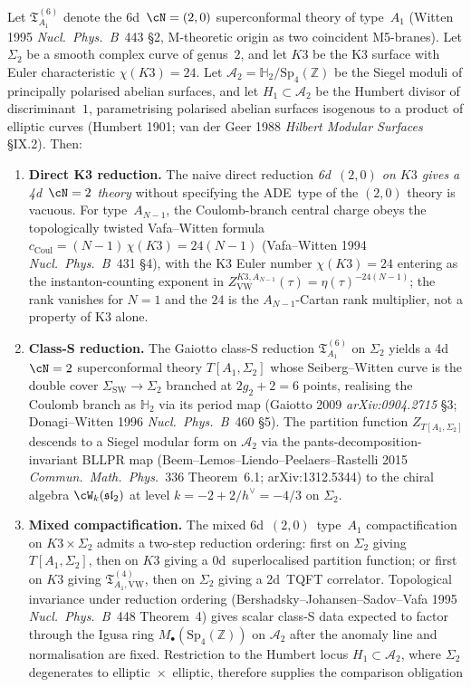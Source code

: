 \begin{proposition}
\label{prop:k3ca-delta5-6d-20-classS-humbert}
Let $\mathfrak T_{A_1}^{(6)}$ denote the 6d~$\cN=(2,0)$ superconformal theory of type~$A_1$ (Witten 1995 \emph{Nucl.\ Phys.\ B}~443 \S2, M-theoretic origin as two coincident M5-branes). Let $\Sigma_2$ be a smooth complex curve of genus~$2$, and let $K3$ be the K3 surface with Euler characteristic $\chi(K3)=24$. Let $\mathcal A_2=\mathbb H_2/\mathrm{Sp}_4(\mathbb Z)$ be the Siegel moduli of principally polarised abelian surfaces, and let $H_1\subset\mathcal A_2$ be the Humbert divisor of discriminant~$1$, parametrising polarised abelian surfaces isogenous to a product of elliptic curves (Humbert 1901; van der Geer 1988 \emph{Hilbert Modular Surfaces} \S IX.2). Then:
\begin{enumerate}[label=\textup{(\roman*)}]
 \item \textbf{Direct K3 reduction.} The naive direct reduction \emph{6d~$(2,0)$ on $K3$ gives a 4d~$\cN=2$ theory} without specifying the ADE~type of the $(2,0)$ theory is vacuous. For type~$A_{N-1}$, the Coulomb-branch central charge obeys the topologically twisted Vafa--Witten formula $c_{\mathrm{Coul}}=(N-1)\,\chi(K3)=24(N-1)$ (Vafa--Witten 1994 \emph{Nucl.\ Phys.\ B}~431 \S4), with the K3 Euler number $\chi(K3)=24$ entering as the instanton-counting exponent in $Z_{\mathrm{VW}}^{K3,A_{N-1}}(\tau)=\eta(\tau)^{-24(N-1)}$; the rank vanishes for $N=1$ and the $24$ is the $A_{N-1}$-Cartan rank multiplier, not a property of K3 alone.
 \item \textbf{Class-S reduction.} The Gaiotto class-S reduction $\mathfrak T_{A_1}^{(6)}$ on $\Sigma_2$ yields a 4d~$\cN=2$ superconformal theory $T[A_1,\Sigma_2]$ whose Seiberg--Witten curve is the double cover $\Sigma_{\mathrm{SW}}\to\Sigma_2$ branched at $2g_2+2=6$ points, realising the Coulomb branch as $\mathbb H_2$ via its period map (Gaiotto 2009 \emph{arXiv:0904.2715} \S3; Donagi--Witten 1996 \emph{Nucl.\ Phys.\ B}~460 \S5). The partition function $Z_{T[A_1,\Sigma_2]}$ descends to a Siegel modular form on $\mathcal A_2$ via the pants-decomposition-invariant BLLPR map (Beem--Lemos--Liendo--Peelaers--Rastelli 2015 \emph{Commun.\ Math.\ Phys.}~336 Theorem~6.1; arXiv:1312.5344) to the chiral algebra $\cW_k(\mathfrak{sl}_2)$ at level $k=-2+2/h^\vee=-4/3$ on $\Sigma_2$.
 \item \textbf{Mixed compactification.} The mixed 6d~$(2,0)$~type~$A_1$ compactification on $K3\times\Sigma_2$ admits a two-step reduction ordering: first on $\Sigma_2$ giving $T[A_1,\Sigma_2]$, then on $K3$ giving a $0$d~superlocalised partition function; or first on $K3$ giving $\mathfrak T^{(4)}_{A_1,\mathrm{VW}}$, then on $\Sigma_2$ giving a 2d~TQFT correlator. Topological invariance under reduction ordering (Bershadsky--Johansen--Sadov--Vafa 1995 \emph{Nucl.\ Phys.\ B}~448 Theorem~4) gives scalar class-S data expected to factor through the Igusa ring $M_\bullet(\mathrm{Sp}_4(\mathbb Z))$ on $\mathcal A_2$ after the anomaly line and normalisation are fixed. Restriction to the Humbert locus $H_1\subset\mathcal A_2$, where $\Sigma_2$ degenerates to elliptic~$\times$~elliptic, therefore supplies the comparison obligation

\end{enumerate}
\end{proposition}
